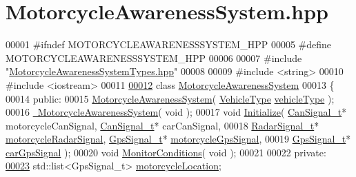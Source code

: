 \hypertarget{MotorcycleAwarenessSystem_8hpp_source}{\section{Motorcycle\-Awareness\-System.\-hpp}
}

\begin{DoxyCode}
00001 \textcolor{preprocessor}{#ifndef MOTORCYCLEAWARENESSSYSTEM\_HPP}
00005 \textcolor{preprocessor}{}\textcolor{preprocessor}{#define MOTORCYCLEAWARENESSSYSTEM\_HPP}
00006 \textcolor{preprocessor}{}
00007 \textcolor{preprocessor}{#include "\hyperlink{MotorcycleAwarenessSystemTypes_8hpp}{MotorcycleAwarenessSystemTypes.hpp}"}
00008 
00009 \textcolor{preprocessor}{#include <string>}
00010 \textcolor{preprocessor}{#include <iostream>}
00011 
\hypertarget{MotorcycleAwarenessSystem_8hpp_source_l00012}{}\hyperlink{classMotorcycleAwarenessSystem}{00012} \textcolor{keyword}{class }\hyperlink{classMotorcycleAwarenessSystem}{MotorcycleAwarenessSystem}
00013 \{
00014     \textcolor{keyword}{public}:
00015         \hyperlink{classMotorcycleAwarenessSystem_ab0fb3823809dc056fecc82cc72a80a55}{MotorcycleAwarenessSystem}( \hyperlink{MotorcycleAwarenessSystemTypes_8hpp_a0c05c42b98a847f971385c81c2a81afa}{VehicleType} 
      \hyperlink{classMotorcycleAwarenessSystem_a977b2085bfbf6a62902bf2d80160e6d2}{vehicleType} );
00016         \hyperlink{classMotorcycleAwarenessSystem_a89ce16a722b3575e1415cbe9c7eedbd3}{~MotorcycleAwarenessSystem}( \textcolor{keywordtype}{void} );
00017         \textcolor{keywordtype}{void} \hyperlink{classMotorcycleAwarenessSystem_a55f1ea16b6311120ea42b460fb8b3a71}{Initialize}( \hyperlink{structCanSignal__t}{CanSignal\_t}* motorcycleCanSignal, 
      \hyperlink{structCanSignal__t}{CanSignal\_t}* carCanSignal,
00018                          \hyperlink{structRadarSignal__t}{RadarSignal\_t}* \hyperlink{classMotorcycleAwarenessSystem_a0744e71b9f440a86f5078c876ba7629b}{motorcycleRadarSignal}, 
      \hyperlink{structGpsSignal__t}{GpsSignal\_t}* \hyperlink{classMotorcycleAwarenessSystem_ab281a3993b574923b2f379ed0477b2d4}{motorcycleGpsSignal},
00019                          \hyperlink{structGpsSignal__t}{GpsSignal\_t}* \hyperlink{classMotorcycleAwarenessSystem_a9a8185e00b60d0be58bfa76166063128}{carGpsSignal} );
00020         \textcolor{keywordtype}{void} \hyperlink{classMotorcycleAwarenessSystem_afb19e832c17d43941d9ed6c4f4435a2e}{MonitorConditions}( \textcolor{keywordtype}{void} );
00021 
00022     \textcolor{keyword}{private}:
\hypertarget{MotorcycleAwarenessSystem_8hpp_source_l00023}{}\hyperlink{classMotorcycleAwarenessSystem_af6becfeb1d11b467cb80a94a8e6940ac}{00023}         std::list<GpsSignal\_t> \hyperlink{classMotorcycleAwarenessSystem_af6becfeb1d11b467cb80a94a8e6940ac}{motorcycleLocation}; 

\end{DoxyCode}
